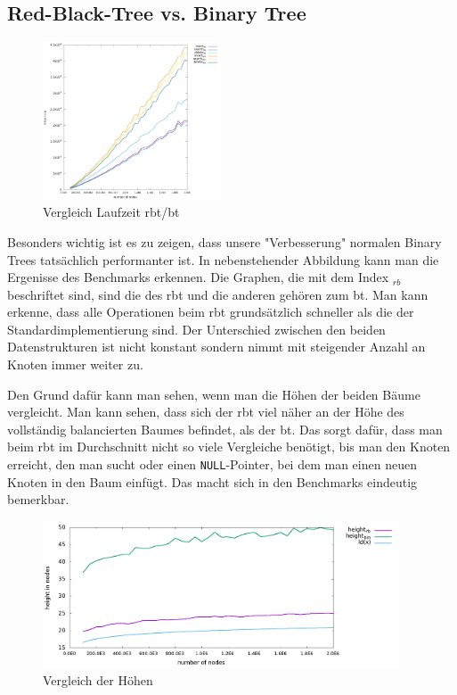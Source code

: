 \documentclass[11pt]{article}
\newcommand{\lstin}[1]{\lstinline[language=C]{#1}}
\begin{document}
\subsection{Red-Black-Tree vs. Binary Tree} \label{bbrbt}

\begin{figure}
  \includegraphics[width=200px]{../benchmark/compare_bin.png}
  \vspace{-20pt}
  \caption{Vergleich Laufzeit \gls{rbt}/\gls{bt}}
  \vspace{-15pt}
\end{figure}

Besonders wichtig ist es zu zeigen, dass unsere "Verbesserung" normalen Binary Trees tatsächlich performanter ist. In nebenstehender Abbildung kann man die Ergenisse des Benchmarks erkennen.
Die Graphen, die mit dem Index $_{rb}$ beschriftet sind, sind die des \gls{rbt} und die anderen gehören zum \gls{bt}.
Man kann erkenne, dass alle Operationen beim \gls{rbt} grundsätzlich schneller als die der Standardimplementierung sind. 
Der Unterschied zwischen den beiden Datenstrukturen ist nicht konstant sondern nimmt mit steigender Anzahl an Knoten immer weiter zu. 

Den Grund dafür kann man sehen, wenn man die Höhen der beiden Bäume vergleicht. Man kann sehen, dass sich der \gls{rbt} viel näher an der Höhe des vollständig balancierten Baumes befindet, 
als der \gls{bt}. Das sorgt dafür, dass man beim \gls{rbt} im Durchschnitt nicht so viele Vergleiche benötigt, bis man den Knoten erreicht, den man sucht oder einen \lstin{NULL}-Pointer, bei dem 
man einen neuen Knoten in den Baum einfügt. Das macht sich in den Benchmarks eindeutig bemerkbar.  

\begin{figure}
  \centering
  \includegraphics[width=400px]{../benchmark/compare_height.png}
  \caption{Vergleich der Höhen}
\end{figure}
\end{document}
